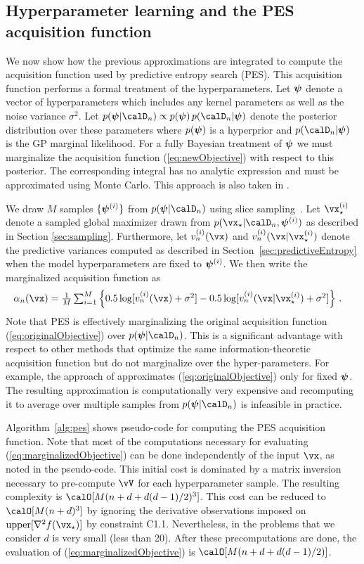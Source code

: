 \subsection{Hyperparameter learning and the PES acquisition function}
\label{sec:hyper-learning}

We now show how the previous approximations are integrated to compute the acquisition function used by 
predictive entropy search (PES).
This acquisition function performs a formal treatment of the hyperparameters. Let $\boldsymbol{\psi}$ denote
a vector of hyperparameters which includes any kernel parameters as well as the
noise variance $\sigma^2$. Let $p(\vpsi|\D_n)\propto p(\vpsi)
\,p(\D_n|\vpsi)$ denote the posterior distribution over these
parameters where $p(\boldsymbol{\psi})$ is a hyperprior  and $p(\D_n|\vpsi)$ is the GP marginal likelihood.
For a fully Bayesian treatment of $\boldsymbol{\psi}$ we must marginalize the acquisition
function (\ref{eq:newObjective}) with respect to this posterior. 
The corresponding integral has no analytic expression and must be approximated using Monte
Carlo. This approach is also taken in \cite{Snoek:2012}.

We draw $M$ samples $\{\boldsymbol{\psi}^{(i)}\}$ from $p(\vpsi|\D_n)$ using
slice sampling~\cite{Vanhatalo:2012}. Let $\xopt\i$ denote a sampled global maximizer
drawn from $p(\xopt|\D_n,\vpsi\i)$ as described in Section \ref{sec:sampling}.  Furthermore, let $v_n\i(\x)$ and $v_n\i(\x|\xopt\i)$ denote
the predictive variances computed as described in
Section~\ref{sec:predictiveEntropy} when the model hyperparameters are fixed to $\boldsymbol{\psi}^{(i)}$. 
We then write the marginalized acquisition function as
\begin{align}
    \alpha_n(\x) 
    &=
    \textstyle
    \frac{1}{M}\sum_{i=1}^M 
    \left\{ 0.5\log[v_n\i(\x)+\sigma^2] - 0.5\log[v_n\i(\x|\xopt\i)+\sigma^2]\right\}
    \,.\label{eq:marginalizedObjective}
\end{align}
Note that PES is effectively marginalizing the original acquisition function
(\ref{eq:originalObjective}) over $p(\vpsi|\D_n)$. This is a significant
advantage with respect to other methods that optimize the same
information-theoretic acquisition function but do not marginalize over
the hyper-parameters. For example, the approach of
\cite{HennigSchuler:2012} approximates
(\ref{eq:originalObjective}) only for fixed $\boldsymbol{\psi}$. The resulting approximation is
computationally very expensive and recomputing it to average over multiple
samples from $p(\vpsi|\D_n)$ is infeasible in practice.  

Algorithm~\ref{alg:pes} shows pseudo-code for computing the PES acquisition
function. Note that most of the computations necessary for evaluating (\ref{eq:marginalizedObjective}) can be done
independently of the input $\x$, as noted in the pseudo-code. This initial cost
is dominated by a matrix inversion necessary to pre-compute $\vV$ for each
hyperparameter sample. The resulting complexity is $\calO[M(n+d + d(d-1)/2)^3]$.
This cost can be reduced to $\calO[M(n+d)^3]$ by ignoring the 
derivative observations imposed on $\upper[\nabla^2 f(\xopt)]$ by constraint C1.1.
Nevertheless, in the problems that we consider $d$ is very small (less than 20).
After these precomputations are done, the evaluation of (\ref{eq:marginalizedObjective})
is $\calO[M(n+d + d(d-1)/2)]$.


